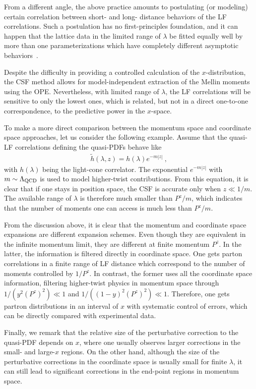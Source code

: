 From a different angle, the above practice amounts
to postulating (or modeling) certain correlation between short- and long-
distance behaviors of the LF correlations. Such a postulation
has no first-principles foundation, and it can happen that the lattice data in
the limited range of $\lambda$ be fitted equally well by more than one parameterizations which
have completely different asymptotic behaviors~\cite{Sufian:2020vzb}.

Despite the difficulty in providing a controlled calculation of the $x$-distribution, the CSF method allows for model-independent extraction of the Mellin moments using the OPE. Nevertheless, with limited range of $\lambda$, the LF correlations will be sensitive to only the lowest ones, which is related, but not in a direct one-to-one correspondence, to the predictive power in the $x$-space.

To make a more direct comparison between the momentum space and coordinate space approaches, let us consider the following example. Assume that the quasi-LF correlations defining the quasi-PDFs behave like
\begin{align}
\tilde h(\lambda,z)=h(\lambda)e^{-m|z|} \ ,
\end{align}
with $h(\lambda)$ being the light-cone correlator. The exponential $e^{-m|z|}$ with $m\sim \Lambda_{\rm QCD}$ is used to model higher-twist contributions.
From this equation, it is clear that if one stays in position space, the CSF is accurate only when $z\ll 1/m$. The available range of $\lambda$ is therefore much smaller than $P^z/m$, which indicates that the number of moments one can access is much less than $P^z/m$.

From the discussion above, it is clear that the momentum and coordinate space expansions are different expansion schemes. Even though they are equivalent in the infinite momentum limit, they are different at finite
momentum $P^z$.
In the latter, the information is filtered directly
in coordinate space. One gets parton correlations
in a finite range of LF distance which correspond to
the number of moments controlled by $1/P^z$. In contrast, the former uses all the coordinate space information, filtering
higher-twist physics in momentum space through $1/(y^2(P^z)^2)\ll 1$ and $1/((1-y)^2(P^z)^2)\ll 1$.
Therefore, one gets partron distributions in an interval of $x$
with systematic control of errors, which can be directly compared
with experimental data.

Finally, we remark that the relative size of the perturbative correction to the quasi-PDF depends on $x$, where one usually observes larger corrections in the small- and large-$x$ regions. On the other hand, although the size of the perturbative corrections in the coordinate space is usually small for finite $\lambda$, it can still lead to significant corrections in the end-point regions in momentum space.
